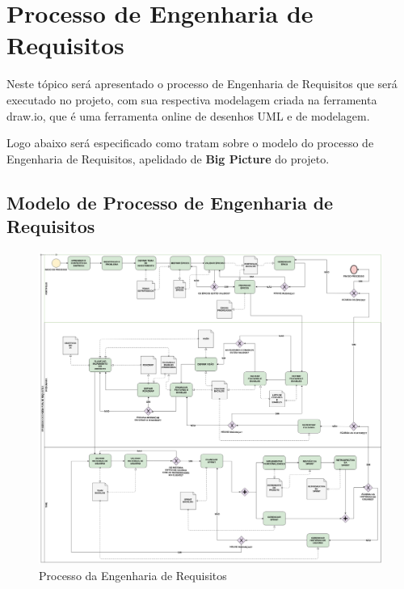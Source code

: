 \chapter{Processo de Engenharia de Requisitos}

  Neste tópico será apresentado o processo de Engenharia de Requisitos que será executado no projeto, com sua respectiva modelagem criada
  na ferramenta draw.io, que é uma ferramenta online de desenhos UML e de modelagem.

  Logo abaixo será especificado como tratam sobre o modelo do processo de Engenharia de Requisitos, apelidado de \textbf{Big Picture}
  do projeto.

\section{Modelo de Processo de Engenharia de Requisitos}

  \begin{figure}[!htb]
    \centering
    \includegraphics[width=15cm, keepaspectratio=true]{figuras/processo/processo.eps}
    \caption{Processo da Engenharia de Requisitos}
  \end{figure}

